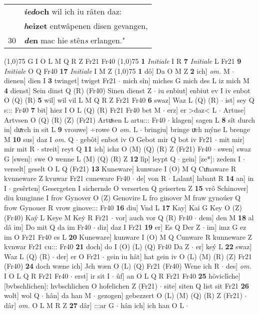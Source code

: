 \documentclass[8pt,a4paper,notitlepage]{article}
\begin{document}
\begin{table}[ht]
\begin{minipage}[t]{0.5\linewidth}
\begin{tabular}{rl}
 & \textbf{\textit{ied}och} wil ich iu râten daz:\\ 
 & \textbf{\textit{h}eizet} entwâpenen disen gevangen,\\ 
30 & \textbf{\textit{de}n} mac hie stên\textit{s} erlangen."\\ 
\end{tabular}
\scriptsize
\line(1,0){75} \newline
G I O L M Q R Z Fr21 Fr40 \newline
\line(1,0){75} \newline
\textbf{1} \textit{Initiale} I R  \textbf{7} \textit{Initiale} L Fr21  \textbf{9} \textit{Initiale} O Q Fr40  \textbf{17} \textit{Initiale} I M Z  \newline
\line(1,0){75} \newline
\textbf{1} dô] Da O M Z \textbf{2} ich] \textit{om.} M  $\cdot$ dienen] dien I \textbf{3} twinget] twiget Fr21  $\cdot$ mich sîn] miches G mich des L iz mich M \textbf{4} dienst] Sein dinst Q (R) (Fr40) Sinen dienst Z  $\cdot$ iu enbiut] enbiut ev I iv enbot O (Q) (R) \textbf{5} wil] wil vil L M Q R Z Fr21 Fr40 \textbf{6} swaz] Waz L (Q) (R)  $\cdot$ ist] sey Q s::: Fr40 \textbf{7} bit] hiez I O L (Q) (R) Fr21 Fr40 bet M  $\cdot$ erz] er >daz< L  $\cdot$ Artuse] Artvsen O (Q) (R) (Z) (Fr21) Artuͯsen L artu::: Fr40  $\cdot$ klagen] sagen L \textbf{8} sît durch in] duͯrch in sit L \textbf{9} vrouwe] ÷rowe O \textit{om.} L  $\cdot$ bringiu] bringe uͯch mýne L brenge M \textbf{10} sus] daz I \textit{om.} Q  $\cdot$ gebôt] enbot iv O Gebot mir Q bot iv Fr21  $\cdot$ mit mir] mir mit R  $\cdot$ streit] reyt Q \textbf{11} ich] ichz O (M) (Q) (R) Z (Fr21) Fr40  $\cdot$ swen] swaz G [swen]: swe O wenne L (M) (Q) (R) Z \textbf{12} lîp] leypt Q  $\cdot$ gein] [ze*]: zedem I  $\cdot$ verselt] geselt O L Q (Fr21) \textbf{13} Kuneware] kunware I (O) M Q Cuͦnaware R kvnneware Z kvnwar Fr21 cuneware Fr40  $\cdot$ de] von R  $\cdot$ Lalant] labant R \textbf{14} an] in I  $\cdot$ gesêrten] Gesergeten I sichernde O verserten Q geiserten Z \textbf{15} vrô Schinover] diu kunginne I frov Gynover O (Z) Genovire L fro ginover M fraw gynoúer Q frow Gynouer R vrow ginove::: Fr40 \textbf{16} diu] Vnd L \textbf{17} Kay] Kai G Key O (Z) (Fr40) Kaý L Keye M Keẏ R Fr21  $\cdot$ vor] auch vor Q (R) Fr40  $\cdot$ dem] den M \textbf{18} al dâ im] Do mit Q da im Fr40  $\cdot$ diz] daz I Fr21 \textbf{19} er] Es Q Der Z  $\cdot$ im] imz G ez im O Fr21 Fr40 es L \textbf{20} Kuneware] kunware I (O) M Q Cunware R kunneware Z kvnwar Fr21 cu::: Fr40 \textbf{21} doch] do I (O) (L) (Q) Fr40 Da Z  $\cdot$ er] keý L \textbf{22} swaz] Waz L (Q) (R)  $\cdot$ der] er O Fr21  $\cdot$ gein iu hât] hat gein iv O (L) (M) (R) (Z) Fr21 (Fr40) \textbf{24} doch wæne ich] Jch wæn O (L) (Q) Fr21 (Fr40) Wene ich R  $\cdot$ des] \textit{om.} I O L Q R Fr21 Fr40  $\cdot$ erst] ir sit I  $\cdot$ ûf] an O L Q R Fr21 Fr40 \textbf{25} höviclîche] [bvbschlichen]: hvbschlichen O hofelichen Z (Fr21)  $\cdot$ site] siten Q list sit Fr21 \textbf{26} wolt] wol Q  $\cdot$ hân] da han M  $\cdot$ gezogen] gebezzert O (L) (M) (Q) (R) Z (Fr21)  $\cdot$ dâr] \textit{om.} O L M R Z \textbf{27} dâr] :::ar G  $\cdot$ hân ich] ich han O L  $\cdot$ 
\end{minipage}
\end{table}
\end{document}
